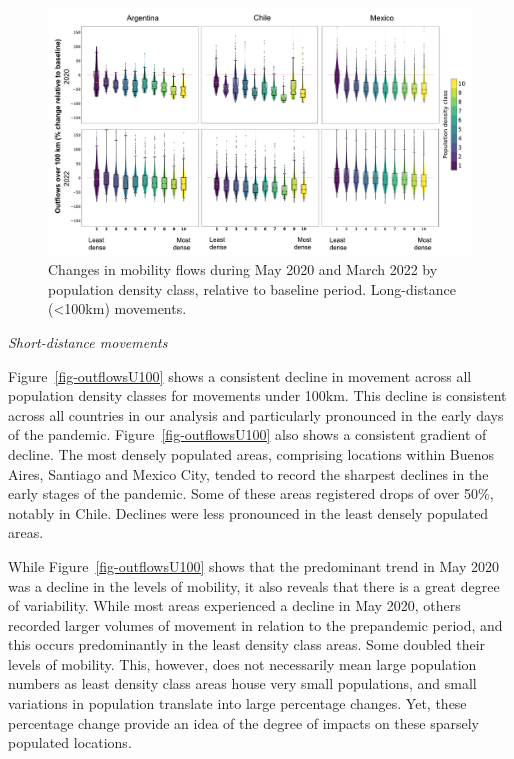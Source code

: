 \documentclass[
  11pt,
]{article}
\begin{document}
\begin{figure}

{\centering \includegraphics{../outputs/all_countries_outflows_o100_minus_Colombia.pdf}

}

\caption{\label{fig-outflowsO100}Changes in mobility flows during May
2020 and March 2022 by population density class, relative to baseline
period. Long-distance (\textless100km) movements.}

\end{figure}

\emph{Short-distance movements}

Figure~\ref{fig-outflowsU100} shows a consistent decline in movement
across all population density classes for movements under 100km. This
decline is consistent across all countries in our analysis and
particularly pronounced in the early days of the pandemic.
Figure~\ref{fig-outflowsU100} also shows a consistent gradient of
decline. The most densely populated areas, comprising locations within
Buenos Aires, Santiago and Mexico City, tended to record the sharpest
declines in the early stages of the pandemic. Some of these areas
registered drops of over 50\%, notably in Chile. Declines were less
pronounced in the least densely populated areas.

While Figure~\ref{fig-outflowsU100} shows that the predominant trend in
May 2020 was a decline in the levels of mobility, it also reveals that
there is a great degree of variability. While most areas experienced a
decline in May 2020, others recorded larger volumes of movement in
relation to the prepandemic period, and this occurs predominantly in the
least density class areas. Some doubled their levels of mobility. This,
however, does not necessarily mean large population numbers as least
density class areas house very small populations, and small variations
in population translate into large percentage changes. Yet, these
percentage change provide an idea of the degree of impacts on these
sparsely populated locations.
\end{document}
